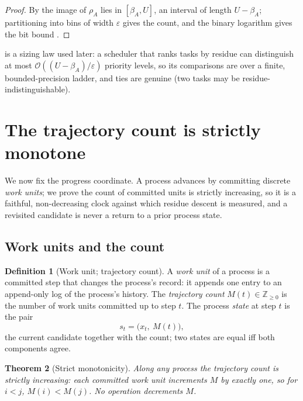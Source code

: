 \documentclass[twocolumn,10pt,a4paper]{article}
\theoremstyle{thmstyle}
\newtheorem{theorem}{Theorem}[section]
\theoremstyle{definition}
\newtheorem{definition}[theorem]{Definition}
\theoremstyle{remark}
\newcommand{\Zp}{\mathbb{Z}_{\ge 0}}
\newcommand{\floor}{\beta}
\newcommand{\res}{\rho}
\newcommand{\Mcount}{M}
\newcommand{\eps}{\varepsilon}
\begin{document}
\begin{proof}
By  the image of $\res_A$ lies in $[\floor_A,U]$, an
interval of length $U-\floor_A$; partitioning into bins of width $\eps$
gives the count, and the binary logarithm gives the bit bound
\citep{shannon1948,cover2006}.
\end{proof}

 is a sizing law used later: a scheduler that ranks tasks
by residue can distinguish at most $\mathcal{O}((U-\floor_A)/\eps)$
priority levels, so its comparisons are over a finite, bounded-precision
ladder, and ties are genuine (two tasks may be residue-indistinguishable).

\section{The trajectory count is strictly monotone}
\label{sec:count}

We now fix the progress coordinate. A process advances by committing
discrete \emph{work units}; we prove the count of committed units is
strictly increasing, so it is a faithful, non-decreasing clock against
which residue descent is measured, and a revisited candidate is never a
return to a prior process state.

\subsection{Work units and the count}

\begin{definition}[Work unit; trajectory count]
\label{def:count}
A \emph{work unit} of a process is a committed step that changes the
process's record: it appends one entry to an append-only log of the
process's history. The \emph{trajectory count} $\Mcount(t)\in\Zp$ is the
number of work units committed up to step $t$. The process \emph{state}
at step $t$ is the pair
\[
s_t=\big(x_t,\ \Mcount(t)\big),
\]
the current candidate together with the count; two states are equal iff
both components agree.
\end{definition}

\begin{theorem}[Strict monotonicity]
\label{thm:monotone}
Along any process the trajectory count is strictly increasing: each
committed work unit increments $\Mcount$ by exactly one, so for $i<j$,
$\Mcount(i)<\Mcount(j)$. No operation decrements $\Mcount$.
\end{theorem}
\end{document}
